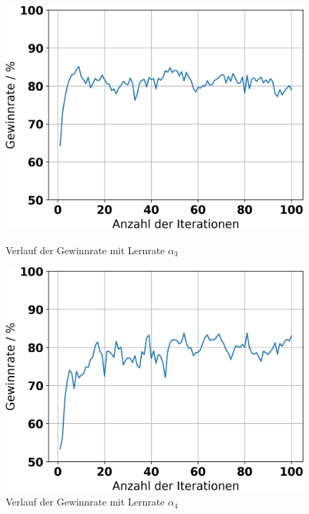 \begin{figure}[H]
	\begin{minipage}[c]{0.32\linewidth}
		\includegraphics[width=\linewidth]{Bilder/ensemble-training/d_0_00003/graph_win_rates.png}
		\caption{Verlauf der Gewinnrate mit Lernrate $\alpha_3$}
	\end{minipage}
	\hfill
	\begin{minipage}[c]{0.32\linewidth}
		\includegraphics[width=\linewidth]{Bilder/ensemble-training/e_0_00001/graph_win_rates.png}
		\caption{Verlauf der Gewinnrate mit Lernrate $\alpha_4$}
	\end{minipage}
	\hfill
	\begin{minipage}[c]{0.32\linewidth}
		\makebox[\linewidth][r]{}
	\end{minipage}
\end{figure}


